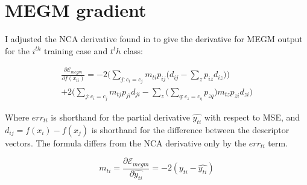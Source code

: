 \chapter{\texorpdfstring{\gls{MEGM}}{} gradient}
\label{chap:megm_appendix} 

I adjusted the \gls{NCA} derivative found in \cite {Salakhutdinov2007a} to give the derivative for \gls{MEGM} output for the $ i^{th} $ training case and $ t^th $ class:

\begin{multline}
\label{eq:megm_grad}
\frac{\partial \mathcal{E}_{megm}}{\partial f(x_{ti})} = 
  -2 \bigg( \sum_{j:c_i = c_j}  m_{ti} {p_{ij} \Big( d_{ij} - \sum_z{p_{iz}d_{iz}} \Big) } \bigg)\\
  +2 \bigg( \sum_{j:c_i = c_j} m_{tj}{p_{ji}d_{ji} - \sum_z{\Big( \sum_{q:c_z = c_q}{p_{zq}} \Big) m_{tz}p_{zi}d_{zi}   }} \bigg)
\end{multline}

Where $ err_{ti} $ is shorthand for the partial derivative $ \hat{y_{ti}} $ with respect to \gls{MSE}, and $ d_{ij} = f(x_i) - f(x_j) $ is shorthand for the difference between the descriptor vectors. The formula differs from the \gls{NCA} derivative only by the $ err_{ti} $ term.

\begin{equation}
m_{ti} = \frac{\partial \mathcal{E}_{megm}}{\partial \hat{y_{ti}}} = -2 (y_{ti} - \hat{y_{ti}})
\label{eq:megm_partial}
\end{equation}